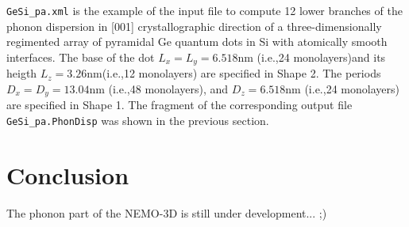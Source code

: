 \documentclass[12pt]{article}
\begin{document}
{\tt GeSi\_pa.xml} is the example of the input file to compute 12
lower branches of the phonon dispersion in [001] crystallographic
direction of a three-dimensionally regimented array of pyramidal Ge
quantum dots in Si with atomically smooth interfaces. The base of the
dot $L_x=L_y=6.518$nm (i.e.,24 monolayers)and its heigth
$L_z=3.26$nm(i.e.,12 monolayers) are specified in Shape 2. The
periods $D_x=D_y=13.04$nm (i.e.,48 monolayers), and $D_z=6.518$nm
(i.e.,24 monolayers) are specified in Shape 1. The fragment of the
corresponding output file {\tt GeSi\_pa.PhonDisp} was shown in the
previous section.

\section{Conclusion}
The phonon part of the NEMO-3D is still under development... ;)
\end{document}
